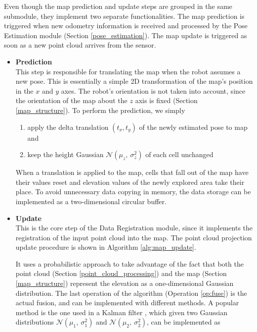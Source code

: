 Even though the map prediction and update steps are grouped in the
same submodule, they implement two separate functionalities.
The map prediction is triggered when new odometry information is received and
processed by the Pose Estimation module (Section \ref{pose_estimation}).
The map update is triggered as soon as a new point cloud arrives from
the sensor.
\begin{itemize}
    \item \textbf{Prediction} \\
        This step is responsible for translating the map when the
        robot assumes a new pose.
        This is essentially a simple 2D transformation of the map's position
        in the $x$ and $y$ axes.
        The robot's orientation is not taken into account, since the
        orientation of the map about the $z$ axis is fixed
        (Section \ref{map_structure}).
        To perform the prediction, we simply

        \begin{enumerate}
            \item apply the delta translation $(t_x,t_y)$ of the
                newly estimated pose to map and
            \item keep the height Gaussian $\mathcal{N}(\mu_z, \ \sigma^2_z)$
                of each cell unchanged
        \end{enumerate}

        When a translation is applied to the map, cells that fall out of the
        map have their values reset and elevation values of the newly explored
        area take their place.
        To avoid unnecessary data copying in memory, the data storage can be
        implemented as a two-dimensional circular buffer.

    \item \label{map_update} \textbf{Update} \\
        This is the core step of the Data Registration module, since it
        implements the registration of the input point cloud into the map.
        The point cloud projection update procedure is shown in Algorithm
        \ref{alg:map_update}.

        It uses a probabilistic approach to take advantage of the
        fact that both the point cloud (Section \ref{point_cloud_processing})
        and the map (Section \ref{map_structure}) represent the elevation
        as a one-dimensional Gaussian distribution.
        The last operation of the algorithm (Operation \ref{op:fuse}) is the
        actual fusion, and can be implemented with different methods.
        A popular method is the one used in a Kalman filter
        \parencite{Cremean2005}, which given two Gaussian distributions
        $\mathcal{N}(\mu_1, \ \sigma^2_1)$ and
        $\mathcal{N}(\mu_2, \ \sigma^2_2)$, can be implemented as


\end{itemize}
